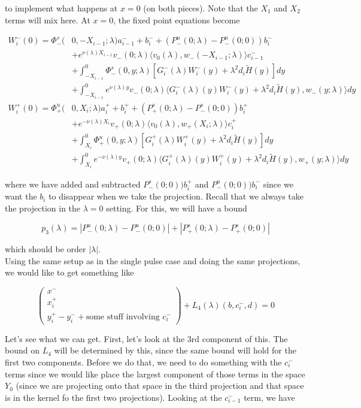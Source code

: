 \documentclass[12pt]{article}
\begin{document}
\begin{enumerate}
to implement what happens at $x = 0$ (on both pieces). Note that the $X_1$ and $X_2$ terms will mix here. At $x = 0$, the fixed point equations become

\begin{align*}
W_i^-(0) = \Phi^s_-(&0, -X_{i-1}; \lambda)a_{i-1}^- + b_i^- + (P^u_-(0; \lambda) - P^u_-(0; 0))b_i^- \\
&+ e^{\nu(\lambda)X_{i-1}} v_-(0; \lambda) \langle v_0(\lambda), w_-(-X_{i-1}; \lambda) \rangle c_{i-1}^- \\
&+ \int_{-X_{i-1}}^0 \Phi^s_-(0, y; \lambda) [ G_i^-(\lambda)W_i^-(y) + \lambda^2 d_i \tilde{H}(y) ] dy \\
&+ \int_{-X_{i-1}}^0
e^{\nu(\lambda)y} v_-(0; \lambda) \langle G_i^-(\lambda)(y)W_i^-(y) + \lambda^2 d_i \tilde{H}(y), w_-(y; \lambda) \rangle dy \\
W_i^+(0) = \Phi^u_+(&0, X_i; \lambda)a_i^+ + b_i^+ + (P^s_+(0; \lambda) - P^s_-(0; 0))b_i^+ \\
&+ e^{-\nu(\lambda) X_i} v_+(0; \lambda) \langle v_0(\lambda), w_+(X_i; \lambda) \rangle c_i^+ \\
&+ \int_{X_i}^0 \Phi^u_+(0, y; \lambda) [ G_i^+(\lambda)W_i^+(y) + \lambda^2 d_i \tilde{H}(y) ] dy \\
&+ \int_{X_i}^0 e^{-\nu(\lambda)y} v_+(0; \lambda) \langle G_i^+(\lambda)(y)W_i^+(y) + \lambda^2 d_i \tilde{H}(y), w_+(y; \lambda) \rangle dy
\end{align*}

where we have added and subtracted $P^s_-(0; 0))b_i^+$ and $P^u_-(0; 0))b_i^-$ since we want the $b_i$ to disappear when we take the projection. Recall that we always take the projection in the $\lambda = 0$ setting. For this, we will have a bound

\[
p_3(\lambda) = |P^u_-(0;\lambda) - P^u_-(0; 0)| + |P^s_+(0;\lambda) - P^s_+(0;0)|
\]

which should be order $|\lambda|$.\\

Using the same setup as in the single pulse case and doing the same projections, we would like to get something like

\[
\begin{pmatrix}x^- \\ x_i^+ \\ y_i^+ - y_i^- + \text{some stuff involving $c_i^-$} \end{pmatrix}+ L_4(\lambda)(b, c_i^-,d) = 0
\]

Let's see what we can get. First, let's look at the 3rd component of this. The bound on $L_4$ will be determined by this, since the same bound will hold for the first two components. Before we do that, we need to do something with the $c_i^-$ terms since we would like place the largest component of those terms in the space $Y_0$ (since we are projecting onto that space in the third projection and that space is in the kernel fo the first two projections). Looking at the $c_{i-1}^-$ term, we have


\end{enumerate}
\end{document}
